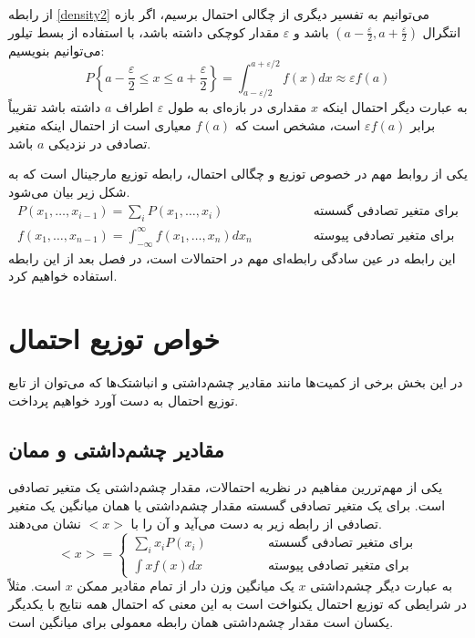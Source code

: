 از رابطه \ref{density2} می‌توانیم به تفسیر دیگری از چگالی احتمال برسیم، اگر بازه انتگرال $( a-\frac{\varepsilon}{2}, a+\frac{\varepsilon}{2} )$ باشد و $\varepsilon$ مقدار کوچکی داشته باشد، با استفاده از بسط تیلور می‌توانیم بنویسیم:
\begin{equation}
    P\left\{a-\frac{\varepsilon}{2} \leq x \leq a+\frac{\varepsilon}{2}\right\}=\int_{a-\varepsilon / 2}^{a+\varepsilon / 2} f(x) d x \approx \varepsilon f(a)
\end{equation}
به عبارت دیگر احتمال اینکه   $x$ مقداری در بازه‌ای به طول $\varepsilon$ اطراف $a$ داشته باشد تقریباً برابر $\varepsilon f(a)$ است، مشخص است که $f(a)$ معیاری است از احتمال اینکه متغیر تصادفی در نزدیکی $a$ باشد.

یکی از روابط مهم در خصوص توزیع و چگالی احتمال، رابطه توزیع مارجینال است که به شکل زیر بیان می‌شود.
\begin{equation}
    \begin{array}{ll}
        P(x_1, \ldots, x_{i-1})=\sum_{i} P(x_{1}, \ldots, x_{i}) & \qquad \qquad {\text{برای متغیر تصادفی گسسته}} \\
        f(x_1, \ldots, x_{n-1})=\int_{-\infty}^{\infty} f(x_{1}, \ldots, x_{n}) d x_{n} & { \qquad \qquad \text {برای متغیر تصادفی پیوسته}}
\end{array}
    \label{marginalization}
\end{equation}
این رابطه در عین سادگی رابطه‌ای مهم در احتمالات است، در فصل بعد از این رابطه استفاده خواهیم کرد.

\section{خواص توزیع احتمال}
\label{ch1:sec7}

در این بخش برخی از کمیت‌ها مانند مقادیر چشم‌داشتی و انباشتک‌ها که می‌توان از تابع توزیع احتمال به دست آورد خواهیم پرداخت.

\subsection{مقادیر چشم‌داشتی و ممان}

یکی از مهم‌تررین مفاهیم در نظریه احتمالات، مقدار چشم‌داشتی یک متغیر تصادفی است. برای یک متغیر تصادفی گسسته مقدار چشم‌داشتی یا همان میانگین یک متغیر تصادفی از رابطه زیر به دست می‌آید و آن را با  $<x>$ نشان می‌دهند.
\begin{equation}
<x>=\left\{\begin{array}{ll}{\sum_{i} x_{i} P(x_{i})} & \qquad \qquad {\text{برای متغیر تصادفی گسسته}} \\ 
{\int x f(x) d x} & { \qquad \qquad \text {برای متغیر تصادفی پیوسته}}\end{array}\right.
\label{mean}
\end{equation}
به عبارت دیگر چشم‌داشتی $x$ یک میانگین وزن دار از تمام مقادیر ممکن $x$ است. مثلاً در شرایطی که توزیع احتمال یکنواخت است به این معنی که احتمال همه نتایج با یکدیگر یکسان است مقدار چشم‌داشتی همان رابطه معمولی برای میانگین است.

